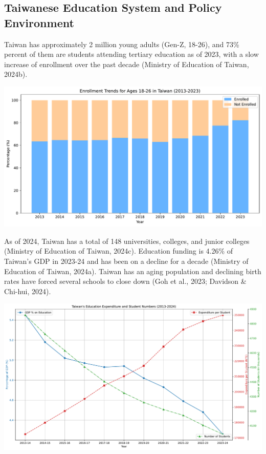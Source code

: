 \documentclass[
  letterpaper,
  DIV=11,
  numbers=noendperiod]{scrartcl}
\begin{document}
\subsection{Taiwanese Education System and Policy
Environment}\label{taiwanese-education-system-and-policy-environment}

Taiwan has approximately 2 million young adults (Gen-Z, 18-26), and 73\%
percent of them are students attending tertiary education as of 2023,
with a slow increase of enrollment over the past decade (Ministry of
Education of Taiwan, 2024b).

\includegraphics{_thesis_files/figure-pdf/cell-7-output-1.pdf}

As of 2024, Taiwan has a total of 148 universities, colleges, and junior
colleges (Ministry of Education of Taiwan, 2024c). Education funding is
4.26\% of Taiwan's GDP in 2023-24 and has been on a decline for a decade
(Ministry of Education of Taiwan, 2024a). Taiwan has an aging population
and declining birth rates have forced several schools to close down (Goh
et al., 2023; Davidson \& Chi-hui, 2024).

\includegraphics{_thesis_files/figure-pdf/cell-8-output-1.pdf}
\end{document}
